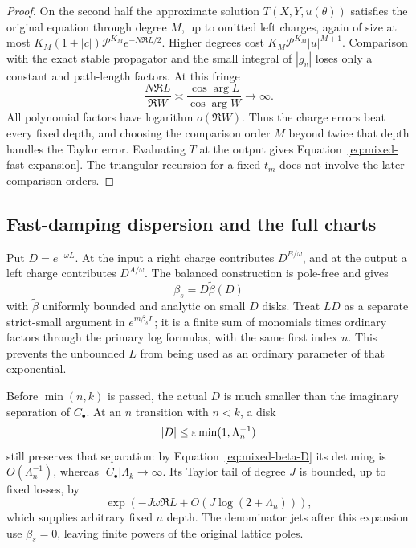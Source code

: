 \begin{proof}
On the second half the approximate solution $T(X,Y,u(\theta))$
satisfies the original equation through degree $M$, up to omitted
left charges, again of size at most
$K_M(1+|c|)\mathcal P^{K_M}e^{-N\Re L/2}$. Higher degrees cost
$K_M\mathcal P^{K_M}|u|^{M+1}$. Comparison with the exact stable
propagator and the small integral of $|g_v|$ loses only a constant
and path-length factors. At this fringe
\[
 \frac{N\Re L}{\Re W}\asymp
 \frac{\cos\arg L}{\cos\arg W}\longrightarrow\infty.
\]
All polynomial factors have logarithm $o(\Re W)$. Thus the charge
errors beat every fixed depth, and choosing the comparison order
$M$ beyond twice that depth handles the Taylor error. Evaluating
$T$ at the output gives Equation~\eqref{eq:mixed-fast-expansion}.
The triangular recursion for a fixed $t_m$ does not involve the
later comparison orders.
\end{proof}

\subsection{Fast-damping dispersion and the full charts}

Put $D=e^{-\omega L}$. At the input a right charge contributes
$D^{B/\omega}$, and at the output a left charge contributes
$D^{A/\omega}$. The balanced construction is pole-free and gives
\begin{equation}\label{eq:mixed-beta-D}
 \beta_s=D\widetilde\beta(D)
\end{equation}
with $\widetilde\beta$ uniformly bounded and analytic on small
$D$ disks. Treat $LD$ as a separate strict-small argument in
$e^{m\beta_sL}$; it is a finite sum of monomials times ordinary
factors through the primary log formulas, with the same first
index $n$. This prevents the unbounded $L$ from being used as an
ordinary parameter of that exponential.

Before $\min(n,k)$ is passed, the actual $D$ is much smaller than
the imaginary separation of $C_\bullet$. At an $n$ transition
with $n<k$, a disk
\begin{equation}\label{eq:mixed-D-radius}
 |D|\leq\varepsilon\min(1,\Lambda_n^{-1})
\end{equation}
still preserves that separation: by
Equation~\eqref{eq:mixed-beta-D} its detuning is $O(\Lambda_n^{-1})$,
whereas $|C_\bullet|\Lambda_k\to\infty$. Its Taylor tail of
degree $J$ is bounded, up to fixed losses, by
\[
 \exp(-J\omega\Re L+O(J\log(2+\Lambda_n))),
\]
which supplies arbitrary fixed $n$ depth. The denominator jets
after this expansion use $\beta_s=0$, leaving finite powers of
the original lattice poles.

